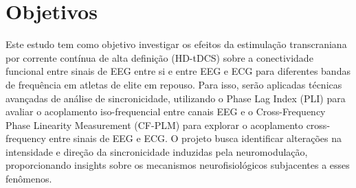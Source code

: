 \chapter{Objetivos}
\label{chap:objetivos}

Este estudo tem como objetivo investigar os efeitos da estimulação transcraniana por corrente contínua de alta definição (HD-tDCS) sobre a conectividade funcional entre sinais de EEG entre si e entre EEG e ECG para diferentes bandas de frequência em atletas de elite em repouso. Para isso, serão aplicadas técnicas avançadas de análise de sincronicidade, utilizando o Phase Lag Index (PLI) para avaliar o acoplamento iso-frequencial entre canais EEG e o Cross-Frequency Phase Linearity Measurement (CF-PLM) para explorar o acoplamento cross-frequency entre sinais de EEG e ECG. O projeto busca identificar alterações na intensidade e direção da sincronicidade induzidas pela neuromodulação, proporcionando insights sobre os mecanismos neurofisiológicos subjacentes a esses fenômenos.